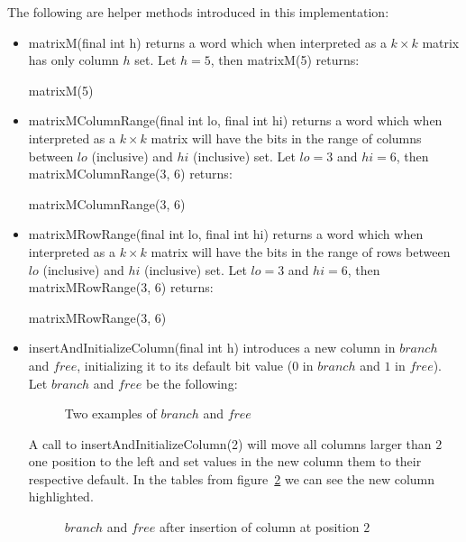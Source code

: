 The following are helper methods introduced in this implementation:
\begin{itemize}
    \item
    {\ttfamily matrixM(final int h)} returns a word which when interpreted as a $k \times k$ matrix has only column $h$ set. Let $h = 5$, then {\ttfamily matrixM(5)} returns:
    \begin{table}[H]
    \centering
    
    \caption{{\ttfamily matrixM(5)}}
    \label{tab:matrixM}
    \end{table}
    
    \item
    {\ttfamily matrixMColumnRange(final int lo, final int hi)} returns a word which when interpreted as a $k \times k$ matrix will have the bits in the range of columns between $lo$ (inclusive) and $hi$ (inclusive) set. Let $lo = 3$ and $hi = 6$, then {\ttfamily matrixMColumnRange(3, 6)} returns:
    \begin{table}[H]
    \centering
    
    \caption{{\ttfamily matrixMColumnRange(3, 6)}}
    \label{tab:MatrixColumnRange}
    \end{table}
    
    \item
    {\ttfamily matrixMRowRange(final int lo, final int hi)} returns a word which when interpreted as a $k \times k$ matrix will have the bits in the range of rows between $lo$ (inclusive) and $hi$ (inclusive) set. Let $lo = 3$ and $hi = 6$, then {\ttfamily matrixMRowRange(3, 6)} returns:
    \begin{table}[H]
    \centering
    
    \caption{{\ttfamily matrixMRowRange(3, 6)}}
    \label{tab:MatrixRowRange}
    \end{table}
    
    \item
    {\ttfamily insertAndInitializeColumn(final int h)} introduces a new column in $branch$ and $free$, initializing it to its default bit value ($0$ in $branch$ and $1$ in $free$).
    Let $branch$ and $free$ be the following:
    \begin{figure}[H]
    \centering
    
    \caption{Two examples of $branch$ and $free$}
    \label{fig:branchAndFreeExample}
    \end{figure}
    A call to {\ttfamily insertAndInitializeColumn(2)} will move all columns larger than $2$ one position to the left and set values in the new column them to their respective default. In the tables from figure~\ref{fig:branchAndFreeAfterColumnInsertion} we can see the new column highlighted.
    \begin{figure}[H]
    \centering
    
    \caption{$branch$ and $free$ after insertion of column at position $2$}
    \label{fig:branchAndFreeAfterColumnInsertion}
    \end{figure}
    

\end{itemize}
